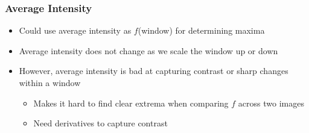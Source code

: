 \documentclass[letterpaper,12pt]{article}
\begin{document}
\subsubsection{Average Intensity}
\begin{itemize}
 \item Could use average intensity as $f$(window) for determining maxima
 \item Average intensity does not change as we scale the window up or down
 \item However, average intensity is bad at capturing contrast or sharp changes within a window
       \begin{itemize}
        \item Makes it hard to find clear extrema when comparing $f$ across two images
        \item Need derivatives to capture contrast
       \end{itemize}
\end{itemize}
\end{document}
